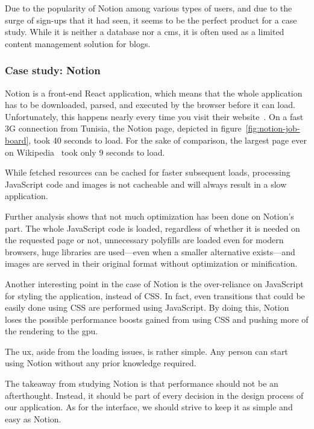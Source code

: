 Due to the popularity of Notion among various types of users, and due to the surge of sign-ups that it had seen, it seems to be the perfect product for a case study.
While it is neither a database nor a \acrshort{cms}, it is often used as a limited content management solution for blogs.

\subsubsection{Case study: Notion}

Notion is a front-end React application, which means that the whole application has to be downloaded, parsed, and executed by the browser before it can load.
Unfortunately, this happens nearly every time you visit their website~\autocite{akulov_case_2020}.
On a fast 3G connection from Tunisia, the Notion page, depicted in figure~\ref{fig:notion-job-board}, took 40 seconds to load. For the sake of comparison, the largest page ever on Wikipedia~\autocite{noauthor_long_nodate} took only 9 seconds to load.


While fetched resources can be cached for faster subsequent loads, processing JavaScript code and images is not \gls{cacheable} and will always result in a slow application.

Further analysis shows that not much optimization has been done on Notion's part.
The whole JavaScript code is loaded, regardless of whether it is needed on the requested page or not, unnecessary \gls{polyfill}s are loaded even for modern browsers, huge libraries are used---even when a smaller alternative exists---and images are served in their original format without optimization or minification.

Another interesting point in the case of Notion is the over-reliance on JavaScript for styling the application, instead of CSS.
In fact, even transitions that could be easily done using CSS are performed using JavaScript.
By doing this, Notion loses the possible performance boosts gained from using CSS and pushing more of the rendering to the \acrfull{gpu}.

The \acrfull{ux}, aside from the loading issues, is rather simple.
Any person can start using Notion without any prior knowledge required.

The takeaway from studying Notion is that performance should not be an afterthought.
Instead, it should be part of every decision in the design process of our application.
As for the interface, we should strive to keep it as simple and easy as Notion.

